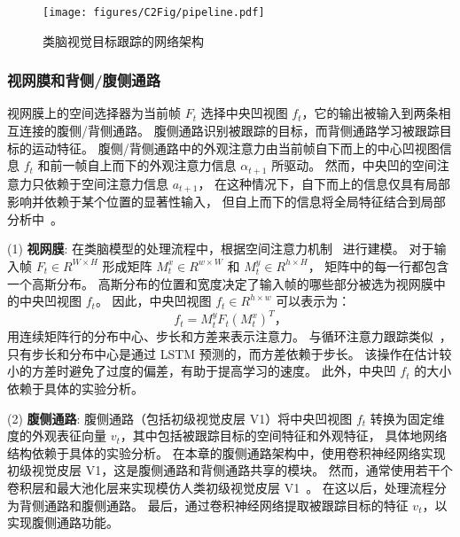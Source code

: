 \begin{figure*}
	\centering
	\texttt{[image: figures/C2Fig/pipeline.pdf]}
	\caption{
		类脑视觉目标跟踪的网络架构
	}
	\label{fig:c2:pipeline}
\end{figure*}

\subsubsection{视网膜和背侧/腹侧通路}

视网膜上的空间选择器为当前帧 $F_t$ 选择中央凹视图 $f_t$，它的输出被输入到两条相互连接的腹侧/背侧通路。
腹侧通路识别被跟踪的目标，而背侧通路学习被跟踪目标的运动特征。
腹侧/背侧通路中的外观注意力由当前帧自下而上的中心凹视图信息 $f_t$ 和前一帧自上而下的外观注意力信息 $\alpha_{t+1}$ 所驱动。
然而，中央凹的空间注意力只依赖于空间注意力信息 $a_{t+1}$，
在这种情况下，自下而上的信息仅具有局部影响并依赖于某个位置的显著性输入，
但自上而下的信息将全局特征结合到局部分析中~\cite{attention}。
%




(1) \textbf{视网膜}: 
在类脑模型的处理流程中，根据空间注意力机制~\cite{ratm} 进行建模。
对于输入帧 $F_t \in R^{W \times H}$ 形成矩阵 $M_t^x \in R^{w \times W}$ 和 $M_t^y \in R^{h \times H}$，
矩阵中的每一行都包含一个高斯分布。
高斯分布的位置和宽度决定了输入帧的哪些部分被选为视网膜中的中央凹视图 $f_t$。
因此，中央凹视图 $f_t \in R^{h \times w}$ 可以表示为：
\begin{equation}
f_t = M_t^y F_t (M_t^x)^T \mbox{，}
\end{equation}
用连续矩阵行的分布中心、步长和方差来表示注意力。
与循环注意力跟踪类似~\cite{hart}，只有步长和分布中心是通过 LSTM 预测的，而方差依赖于步长。
该操作在估计较小的方差时避免了过度的偏差，有助于提高学习的速度。
此外，中央凹 $f_t$ 的大小依赖于具体的实验分析。


(2) \textbf{腹侧通路}: 
腹侧通路（包括初级视觉皮层 V1）将中央凹视图 $f_t$ 转换为固定维度的外观表征向量 $v_t$，其中包括被跟踪目标的空间特征和外观特征，
具体地网络结构依赖于具体的实验分析。
在本章的腹侧通路架构中，使用卷积神经网络实现初级视觉皮层 V1，这是腹侧通路和背侧通路共享的模块。
然而，通常使用若干个卷积层和最大池化层来实现模仿人类初级视觉皮层 V1~\cite{theoretical_neuroscience}。
在这以后，处理流程分为背侧通路和腹侧通路。
最后，通过卷积神经网络提取被跟踪目标的特征 $v_t$，以实现腹侧通路功能。

